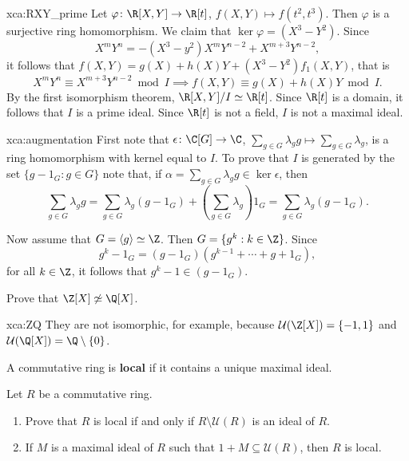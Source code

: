 \begin{sol}{xca:RXY_prime}
	Let $\varphi\colon\R[X,Y]\to\R[t]$, $f(X,Y)\mapsto f(t^2,t^3)$. 
	Then $\varphi$ is a surjective ring homomorphism. We claim that
	$\ker\varphi=(X^3-Y^2)$. Since 
	\[
		X^mY^n=-(X^3-y^2)X^mY^{n-2}+X^{m+3}Y^{n-2}, 
	\]
	it follows
	that $f(X,Y)=g(X)+h(X)Y+(X^3-Y^2)f_1(X,Y)$, that is 
	\[
	X^mY^n\equiv X^{m+3}Y^{n-2}\bmod I
	\implies
	f(X,Y)\equiv g(X)+h(X)Y\bmod I.
	\]
	By the first isomorphism theorem, $\R[X,Y]/I\simeq\R[t]$. Since $\R[t]$ is
	a domain, it follows that $I$ is a prime ideal. Since $\R[t]$ is not a
	field, $I$ is not a maximal ideal.
\end{sol}

\begin{sol}{xca:augmentation}
	First note that $\epsilon\colon\C[G]\to\C$, $\sum_{g\in G}\lambda_gg\mapsto \sum_{g\in G}\lambda_g$, 
	is a ring homomorphism with kernel equal to $I$. To prove
	that $I$ is generated by the set $\{g-1_G:g\in G\}$ note that, 
	if $\alpha=\sum_{g\in G}\lambda_gg\in \ker\epsilon$, then 
	\[
		\sum_{g\in G}\lambda_gg=\sum_{g\in G}\lambda_g(g-1_G)+\left(\sum_{g\in G}\lambda_g\right)1_G
		=\sum_{g\in G}\lambda_g(g-1_G).
	\]
	
	Now assume that $G=\langle g\rangle\simeq\Z$. Then $G=\{g^k:k\in\Z\}$. 
	Since 
	\[
		g^k-1_G=(g-1_G)(g^{k-1}+\cdots+g+1_G),
	\]
	for all $k\in\Z$, it follows that $g^k-1\in (g-1_G)$. 
\end{sol}

\begin{exercise}
    \label{xca:ZQ}
    Prove that $\Z[X]\not\simeq\Q[X]$.
\end{exercise}

\begin{sol}{xca:ZQ}
    They are not isomorphic, for example, because
    $\mathcal{U}(\Z[X])=\{-1,1\}$ and $\mathcal{U}(\Q[X])=\Q\setminus\{0\}$. 
\end{sol}

A commutative ring is \textbf{local} if it contains a unique maximal ideal. 

\begin{exercise}
    \label{xca:local}
    Let $R$ be a commutative ring.
    \begin{enumerate}
        \item Prove that $R$ is local if and only if $R\setminus\mathcal{U}(R)$ is an ideal of $R$.
        \item If $M$ is a maximal ideal of $R$ such that $1+M\subseteq\mathcal{U}(R)$, then $R$ is local.
    \end{enumerate}
\end{exercise}

